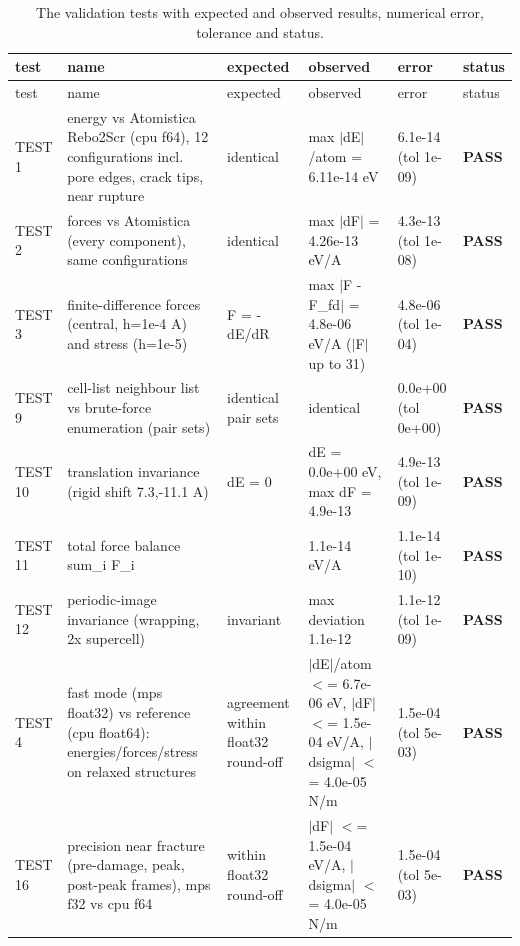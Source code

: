 \begingroup\footnotesize\setlength{\tabcolsep}{4pt}
\begin{longtable}{>{\raggedright\arraybackslash}p{1.1cm}>{\raggedright\arraybackslash}p{4.4cm}>{\raggedright\arraybackslash}p{2.7cm}>{\raggedright\arraybackslash}p{4.1cm}>{\raggedright\arraybackslash}p{1.2cm}p{0.9cm}}
\caption{The \nTests{} validation tests with expected and observed results, numerical error, tolerance and status.}\label{tab:si-validation}\\
\toprule test & name & expected & observed & error & status\\ \midrule\endfirsthead
\toprule test & name & expected & observed & error & status\\ \midrule\endhead
TEST 1 & energy vs Atomistica Rebo2Scr (cpu f64), 12 configurations incl. pore edges, crack tips, near rupture & identical & max $|$dE$|$/atom = 6.11e-14 eV & 6.1e-14 (tol 1e-09) & \textbf{PASS}\\
TEST 2 & forces vs Atomistica (every component), same configurations & identical & max $|$dF$|$ = 4.26e-13 eV/A & 4.3e-13 (tol 1e-08) & \textbf{PASS}\\
TEST 3 & finite-difference forces (central, h=1e-4 A) and stress (h=1e-5) & F = -dE/dR & max $|$F - F\_fd$|$ = 4.8e-06 eV/A ($|$F$|$ up to 31) & 4.8e-06 (tol 1e-04) & \textbf{PASS}\\
TEST 9 & cell-list neighbour list vs brute-force enumeration (pair sets) & identical pair sets & identical & 0.0e+00 (tol 0e+00) & \textbf{PASS}\\
TEST 10 & translation invariance (rigid shift 7.3,-11.1 A) & dE = 0 & dE = 0.0e+00 eV, max dF = 4.9e-13 & 4.9e-13 (tol 1e-09) & \textbf{PASS}\\
TEST 11 & total force balance sum\_i F\_i & 0 & 1.1e-14 eV/A & 1.1e-14 (tol 1e-10) & \textbf{PASS}\\
TEST 12 & periodic-image invariance (wrapping, 2x supercell) & invariant & max deviation 1.1e-12 & 1.1e-12 (tol 1e-09) & \textbf{PASS}\\
TEST 4 & fast mode (mps float32) vs reference (cpu float64): energies/forces/stress on relaxed structures & agreement within float32 round-off & $|$dE$|$/atom $<$= 6.7e-06 eV, $|$dF$|$ $<$= 1.5e-04 eV/A, $|$dsigma$|$ $<$= 4.0e-05 N/m & 1.5e-04 (tol 5e-03) & \textbf{PASS}\\
TEST 16 & precision near fracture (pre-damage, peak, post-peak frames), mps f32 vs cpu f64 & within float32 round-off & $|$dF$|$ $<$= 1.5e-04 eV/A, $|$dsigma$|$ $<$= 4.0e-05 N/m & 1.5e-04 (tol 5e-03) & \textbf{PASS}\\

\end{longtable}
